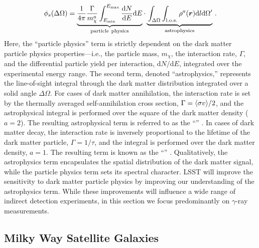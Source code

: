 \begin{equation}
   \phi_s(\Delta\Omega) =
    \underbrace{ \frac{1}{4\pi} \frac{\Gamma}{m_{\chi}^{a}}\int^{E_{\max}}_{E_{\min}}\frac{\text{d}N}{\text{d}E}\text{d}E}_{\rm particle\ physics}
    \cdot
    \underbrace{\vphantom{\int_{E_{\min}}} \int_{\Delta\Omega}\int_{\rm l.o.s.}\rho^{a}(\vect{r})\text{d}l\text{d}\Omega '}_{\rm astrophysics}\,.
    \label{eqn:indirect}
\end{equation}
\noindent Here, the ``particle physics'' term is strictly dependent on the dark matter particle physics properties---i.e., the particle mass, $m_\chi$,  the interaction rate, $\Gamma$, and the differential particle yield per interaction, $\text{d}N/\text{d}E$, integrated over the experimental energy range.
The second term, denoted ``astrophysics,'' represents the line-of-sight integral through the dark matter distribution integrated over a solid angle $\Delta\Omega$. 
For cases of dark matter annihilation, the interaction rate is set by the thermally averaged self-annihilation cross section, $\Gamma = \langle \sigma v \rangle/2$, and the astrophysical integral is performed over the square of the dark matter density ($a=2$). 
The resulting astrophysical term is referred to as the ``\Jfactor'' \citep[\eg,][]{1998APh.....9..137B}. 
In cases of dark matter decay, the interaction rate is inversely proportional to the lifetime of the dark matter particle, $\Gamma = 1/\tau$, and the integral is performed over the dark matter density, $a=1$. 
The resulting term is known as the ``\Dfactor'' \citep[\eg][]{1408.0002}.
Qualitatively, the astrophysics term encapsulates the spatial distribution of the dark matter signal, while the particle physics term sets its spectral character. 
LSST will improve the sensitivity to dark matter particle physics by improving our understanding of the astrophysics term.
While these improvements will influence a wide range of indirect detection experiments, in this section we focus predominantly on $\gamma$-ray measurements.


\subsection{Milky Way Satellite Galaxies }
\label{sec:dwarfs_id}

